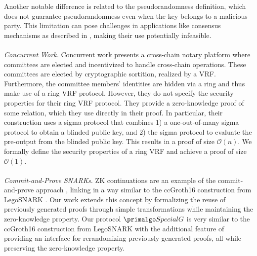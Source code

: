 Another notable difference is related to the pseudorandomness definition, which does not guarantee pseudorandomness even when the key belongs to a malicious party. This limitation can pose challenges in applications like consensus mechanisms as described in \cite{anonymousVRF}, making their use potentially infeasible.
\\\\
\noindent\textit{Concurrent Work.} 
Concurrent work \cite{YinZXLR22} presents a cross-chain notary platform where
committees are elected and incentivized to handle cross-chain operations.
These committees are elected by cryptographic sortition, realized by a VRF.
Furthermore, the committee members' identities are hidden via a ring and thus make use of a ring VRF protocol.
However, they do not specify the security properties for their ring VRF protocol.
They provide a zero-knowledge proof of some relation, which they use directly in their proof.
In particular, their construction uses a sigma protocol that combines 1) a one-out-of-many sigma protocol  to obtain a blinded public key, and 2) the sigma protocol to evaluate the pre-output from the blinded public key. This results in a proof of size $\mathcal{O}(n)$.
We formally define the security properties of a ring VRF and achieve a proof of size $\mathcal{O}(1)$.
\\\\
\noindent\textit{Commit-and-Prove SNARKs.} ZK continuations are an example of the commit-and-prove approach \cite{LegoSNARK}, linking  in a way similar to the ccGroth16 construction from LegoSNARK \cite{LegoSNARK}. Our work extends this concept by formalizing the reuse of previously generated proofs through simple transformations while maintaining the zero-knowledge property. Our protocol $ \SpecialG $ is very similar to the ccGroth16 construction from LegoSNARK \cite{LegoSNARK} with the additional feature of providing an interface for rerandomizing previously generated proofs, all while preserving the zero-knowledge property. 
\\\\
